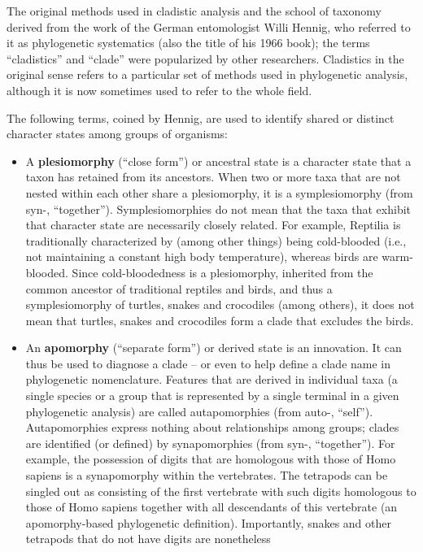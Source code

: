 \documentclass[]{book}
\theoremstyle{definition}
\theoremstyle{definition}
\theoremstyle{definition}
\theoremstyle{remark}
\begin{document}
The original methods used in cladistic analysis and the school of
taxonomy derived from the work of the German entomologist Willi Hennig,
who referred to it as phylogenetic systematics (also the title of his
1966 book); the terms ``cladistics'' and ``clade'' were popularized by
other researchers. Cladistics in the original sense refers to a
particular set of methods used in phylogenetic analysis, although it is
now sometimes used to refer to the whole field.

The following terms, coined by Hennig, are used to identify shared or
distinct character states among groups of organisms:

\begin{itemize}
\item
  A \textbf{plesiomorphy} (``close form'') or ancestral state is a
  character state that a taxon has retained from its ancestors. When two
  or more taxa that are not nested within each other share a
  plesiomorphy, it is a symplesiomorphy (from syn-, ``together'').
  Symplesiomorphies do not mean that the taxa that exhibit that
  character state are necessarily closely related. For example, Reptilia
  is traditionally characterized by (among other things) being
  cold-blooded (i.e., not maintaining a constant high body temperature),
  whereas birds are warm-blooded. Since cold-bloodedness is a
  plesiomorphy, inherited from the common ancestor of traditional
  reptiles and birds, and thus a symplesiomorphy of turtles, snakes and
  crocodiles (among others), it does not mean that turtles, snakes and
  crocodiles form a clade that excludes the birds.
\item
  An \textbf{apomorphy} (``separate form'') or derived state is an
  innovation. It can thus be used to diagnose a clade -- or even to help
  define a clade name in phylogenetic nomenclature. Features that are
  derived in individual taxa (a single species or a group that is
  represented by a single terminal in a given phylogenetic analysis) are
  called autapomorphies (from auto-, ``self''). Autapomorphies express
  nothing about relationships among groups; clades are identified (or
  defined) by synapomorphies (from syn-, ``together''). For example, the
  possession of digits that are homologous with those of Homo sapiens is
  a synapomorphy within the vertebrates. The tetrapods can be singled
  out as consisting of the first vertebrate with such digits homologous
  to those of Homo sapiens together with all descendants of this
  vertebrate (an apomorphy-based phylogenetic definition). Importantly,
  snakes and other tetrapods that do not have digits are nonetheless

\end{itemize}
\end{document}
